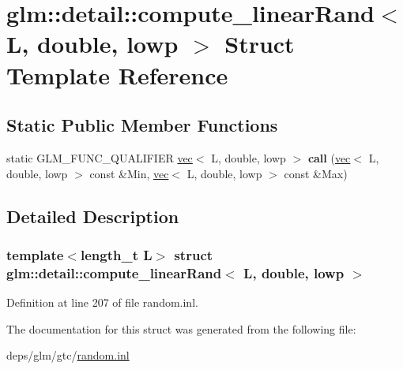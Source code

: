 \hypertarget{structglm_1_1detail_1_1compute__linearRand_3_01L_00_01double_00_01lowp_01_4}{}\section{glm\+:\+:detail\+:\+:compute\+\_\+linear\+Rand$<$ L, double, lowp $>$ Struct Template Reference}
\label{structglm_1_1detail_1_1compute__linearRand_3_01L_00_01double_00_01lowp_01_4}
\subsection*{Static Public Member Functions}
\begin{DoxyCompactItemize}
\item 
\mbox{\label{structglm_1_1detail_1_1compute__linearRand_3_01L_00_01double_00_01lowp_01_4_af0a4b81f622ed6b9d394981f3ff88a08}} 
static G\+L\+M\+\_\+\+F\+U\+N\+C\+\_\+\+Q\+U\+A\+L\+I\+F\+I\+ER \hyperlink{structglm_1_1vec}{vec}$<$ L, double, lowp $>$ {\bfseries call} (\hyperlink{structglm_1_1vec}{vec}$<$ L, double, lowp $>$ const \&Min, \hyperlink{structglm_1_1vec}{vec}$<$ L, double, lowp $>$ const \&Max)
\end{DoxyCompactItemize}


\subsection{Detailed Description}
\subsubsection*{template$<$length\+\_\+t L$>$\newline
struct glm\+::detail\+::compute\+\_\+linear\+Rand$<$ L, double, lowp $>$}



Definition at line 207 of file random.\+inl.



The documentation for this struct was generated from the following file\+:\begin{DoxyCompactItemize}
\item 
deps/glm/gtc/\hyperlink{random_8inl}{random.\+inl}\end{DoxyCompactItemize}
